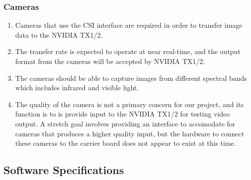 \documentclass[letterpaper,10pt,serif,draftclsnofoot,onecolumn,compsoc,titlepage]{IEEEtran}
\begin{document}
\subsubsection{Cameras}

\begin{enumerate}[label=\alph*]
	\item Cameras that use the CSI interface are required in order to transfer image data to 
	the NVIDIA TX1/2.\\
	\item The transfer rate is expected to operate at near real-time, and the output format 
	from the cameras will be accepted by NVIDIA TX1/2.\\
	\item The cameras should be able to capture images from different spectral bands 
	which includes infrared and visible light.\\
	\item The quality of the camera is not a primary concern for our project, and its 
	function is to is provide input to the NVIDIA TX1/2 for testing video output. 
	A stretch goal involves providing an interface to accomodate for cameras that 
	produces a higher quality input, but the hardware to connect these cameras to the 
	carrier board does not appear to exist at this time.\\
\end{enumerate}

\subsection{Software Specifications}
\end{document}

